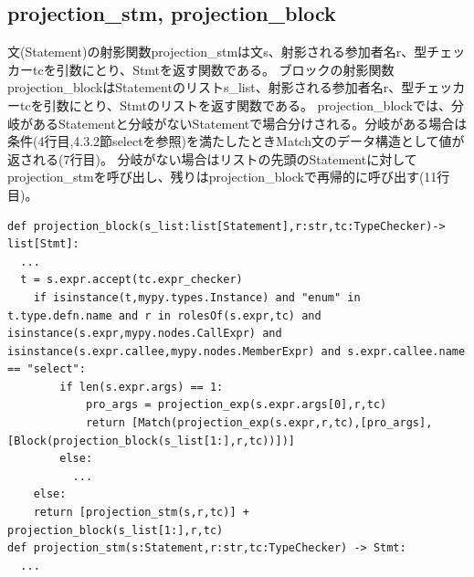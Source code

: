 \documentclass{thesis}
\begin{document}
\subsection{projection\_stm, projection\_block}
文(Statement)の射影関数projection\_stmは文\textsf{s}、射影される参加者名\textsf{r}、型チェッカー\textsf{tc}を引数にとり、\textsf{Stmt}を返す関数である。
ブロックの射影関数projection\_blockはStatementのリスト\textsf{s\_list}、射影される参加者名\textsf{r}、型チェッカー\textsf{tc}を引数にとり、\textsf{Stmt}のリストを返す関数である。
projection\_blockでは、分岐があるStatementと分岐がないStatementで場合分けされる。分岐がある場合は条件(4行目,4.3.2節selectを参照)を満たしたときMatch文のデータ構造として値が返される(7行目)。
分岐がない場合はリストの先頭のStatementに対してprojection\_stmを呼び出し、残りはprojection\_blockで再帰的に呼び出す(11行目)。
\begin{lstlisting}[caption=pro\_s.py]
def projection_block(s_list:list[Statement],r:str,tc:TypeChecker)-> list[Stmt]:
  ... 
  t = s.expr.accept(tc.expr_checker) 
    if isinstance(t,mypy.types.Instance) and "enum" in t.type.defn.name and r in rolesOf(s.expr,tc) and isinstance(s.expr,mypy.nodes.CallExpr) and isinstance(s.expr.callee,mypy.nodes.MemberExpr) and s.expr.callee.name == "select":
        if len(s.expr.args) == 1:
            pro_args = projection_exp(s.expr.args[0],r,tc)
            return [Match(projection_exp(s.expr,r,tc),[pro_args],[Block(projection_block(s_list[1:],r,tc))])]
        else:
          ... 
    else:
    return [projection_stm(s,r,tc)] + projection_block(s_list[1:],r,tc) 
def projection_stm(s:Statement,r:str,tc:TypeChecker) -> Stmt:
  ... 
\end{lstlisting}
\end{document}
